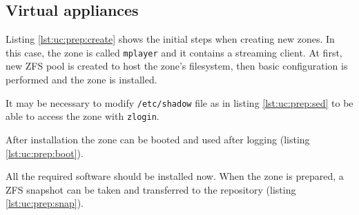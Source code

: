 \documentclass[11pt]{book}
\begin{document}
      \subsection{Virtual appliances}
      \label{ssub:case:prep:va}

        Listing \ref{lst:uc:prep:create} shows the initial steps when creating new zones. In this case, the zone is
        called \texttt{mplayer} and it contains a streaming client. At first, new ZFS pool is created to host the zone's
        filesystem, then basic configuration is performed and the zone is installed. \\

        \noindent
        \begin{minipage}{\textwidth}
          
        \end{minipage}

        \noindent
        It may be necessary to modify \texttt{/etc/shadow} file as in listing \ref{lst:uc:prep:sed} to be able to access
        the zone with \texttt{zlogin}. \\

        \noindent
        \begin{minipage}{\textwidth}
          
        \end{minipage}

        \noindent
        After installation the zone can be booted and used after logging (listing \ref{lst:uc:prep:boot}). \\

        \noindent
        \begin{minipage}{\textwidth}
          
        \end{minipage}

        \noindent
        All the required software should be installed now. When the zone is prepared, a ZFS snapshot can be taken and
        transferred to the repository (listing \ref{lst:uc:prep:snap}). \\

        \noindent
        \begin{minipage}{\textwidth}
          
        \end{minipage}
\end{document}
